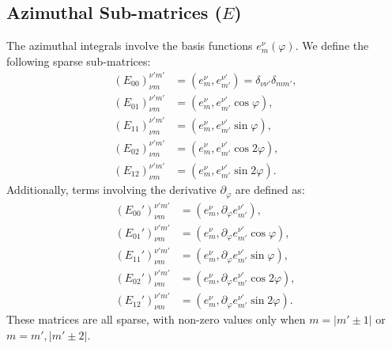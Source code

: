 \documentclass[preprint,12pt]{elsarticle}
\begin{document}
\subsection{Azimuthal Sub-matrices ($E$)}
The azimuthal integrals involve the basis functions $e_m^\nu(\varphi)$. We define the following sparse sub-matrices:
\begin{align}
    (E_{00})_{\nu m}^{\nu' m'} &= (e_{m}^{\nu}, e_{m'}^{\nu'}) = \delta_{\nu \nu'}\delta_{m m'}, \\
    (E_{01})_{\nu m}^{\nu' m'} &= (e_{m}^{\nu}, e_{m'}^{\nu'} \cos \varphi), \\
    (E_{11})_{\nu m}^{\nu' m'} &= (e_{m}^{\nu}, e_{m'}^{\nu'} \sin \varphi), \\
    (E_{02})_{\nu m}^{\nu' m'} &= (e_{m}^{\nu}, e_{m'}^{\nu'} \cos 2\varphi), \\
    (E_{12})_{\nu m}^{\nu' m'} &= (e_{m}^{\nu}, e_{m'}^{\nu'} \sin 2\varphi).
\end{align}
Additionally, terms involving the derivative $\partial_\varphi$ are defined as:
\begin{align}
    (E_{00}')_{\nu m}^{\nu' m'} &= (e_{m}^{\nu}, \partial_\varphi e_{m'}^{\nu'}), \\
    (E_{01}')_{\nu m}^{\nu' m'} &= (e_{m}^{\nu}, \partial_\varphi e_{m'}^{\nu'} \cos \varphi), \\
    (E_{11}')_{\nu m}^{\nu' m'} &= (e_{m}^{\nu}, \partial_\varphi e_{m'}^{\nu'} \sin \varphi), \\
    (E_{02}')_{\nu m}^{\nu' m'} &= (e_{m}^{\nu}, \partial_\varphi e_{m'}^{\nu'} \cos 2\varphi), \\
    (E_{12}')_{\nu m}^{\nu' m'} &= (e_{m}^{\nu}, \partial_\varphi e_{m'}^{\nu'} \sin 2\varphi).
\end{align}
These matrices are all sparse, with non-zero values only when $m = |m' \pm 1|$ or $m = m', |m' \pm 2|$.
\end{document}
